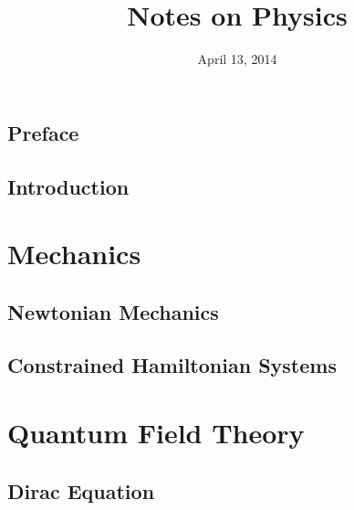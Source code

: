 \documentclass[oneside]{book}
\title{Notes on Physics}
\date{April 13, 2014}
\begin{document}
\frontmatter
\hypersetup{pageanchor=false}
\maketitle
\nocite{*}
\chapter{Preface}
\hypersetup{pageanchor=true}


\tableofcontents

\mainmatter
\chapter{Introduction}


\part{Mechanics}
\chapter{Newtonian Mechanics}


\chapter{Constrained Hamiltonian Systems}


\part{Quantum Field Theory}
\chapter{Dirac Equation}


\backmatter
\appendix
\printbibliography[heading=bibintoc]
\end{document}
